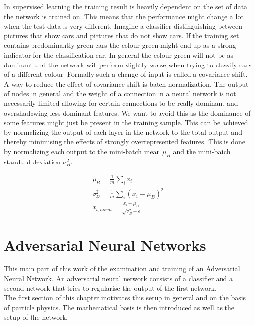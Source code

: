 In supervised learning the training result is heavily dependent on the set of data the network is trained on. This means that the performance might change a lot when the test data is very different. Imagine a classifier distinguishing between pictures that show cars and pictures that do not show cars. If the training set contains predominantly green cars the colour green might end up as a strong indicator for  the classification car. In general the colour green will not be as dominant and the network will perform slightly worse when trying to classify cars of a different colour. Formally such a change of input is called a covariance shift.\\
A way to reduce the effect of covariance shift is batch normalization. The output of nodes in general and the weight of a connection in a neural network is not necessarily limited allowing for certain connections to be really dominant and overshadowing less dominant features. We want to avoid this as the dominance of some features might just be present in the training sample. This can be achieved by normalizing the output of each layer in the network to the total output and thereby minimising the effects of strongly overrepresented features. This is done by normalizing each output to the mini-batch mean $\mu_B$ and the mini-batch standard deviation $\sigma_B^2$.

\begin{align}
    \mu_B = \frac{1}{m} \sum_i x_i\\
    \sigma_B^2 = \frac{1}{m} \sum_i (x_i - \mu_B)^2\\
    x_{i,norm} = \frac{x_i - \mu_B}{\sqrt{\sigma_B^2 + \epsilon}}
\end{align}





\section{Adversarial Neural Networks}

This main part of this work of the examination and training of an Adversarial Neural Network. An adversarial neural network consists of a classifier and a second network that tries to regularise the output of the first network.\\
The first section of this chapter motivates this setup in general and on the basis of particle physics. The mathematical basis is then introduced as well as the setup of the network. \cite{2014arXiv1406.2661G}

